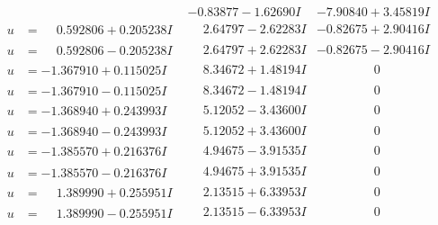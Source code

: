 \documentclass[1p]{elsarticle_modified}
\theoremstyle{definition}
\begin{document}
$$\begin{array}{c|c|c}
 & -0.83877 - 1.62690 I & -7.90840 + 3.45819 I \\ \hline\begin{aligned}
u &= \phantom{-}0.592806 + 0.205238 I\end{aligned}
 & \phantom{-}2.64797 - 2.62283 I & -0.82675 + 2.90416 I \\ \hline\begin{aligned}
u &= \phantom{-}0.592806 - 0.205238 I\end{aligned}
 & \phantom{-}2.64797 + 2.62283 I & -0.82675 - 2.90416 I \\ \hline\begin{aligned}
u &= -1.367910 + 0.115025 I\end{aligned}
 & \phantom{-}8.34672 + 1.48194 I & \phantom{-0.000000 } 0 \\ \hline\begin{aligned}
u &= -1.367910 - 0.115025 I\end{aligned}
 & \phantom{-}8.34672 - 1.48194 I & \phantom{-0.000000 } 0 \\ \hline\begin{aligned}
u &= -1.368940 + 0.243993 I\end{aligned}
 & \phantom{-}5.12052 - 3.43600 I & \phantom{-0.000000 } 0 \\ \hline\begin{aligned}
u &= -1.368940 - 0.243993 I\end{aligned}
 & \phantom{-}5.12052 + 3.43600 I & \phantom{-0.000000 } 0 \\ \hline\begin{aligned}
u &= -1.385570 + 0.216376 I\end{aligned}
 & \phantom{-}4.94675 - 3.91535 I & \phantom{-0.000000 } 0 \\ \hline\begin{aligned}
u &= -1.385570 - 0.216376 I\end{aligned}
 & \phantom{-}4.94675 + 3.91535 I & \phantom{-0.000000 } 0 \\ \hline\begin{aligned}
u &= \phantom{-}1.389990 + 0.255951 I\end{aligned}
 & \phantom{-}2.13515 + 6.33953 I & \phantom{-0.000000 } 0 \\ \hline\begin{aligned}
u &= \phantom{-}1.389990 - 0.255951 I\end{aligned}
 & \phantom{-}2.13515 - 6.33953 I & \phantom{-0.000000 } 0 \\ \hline\begin{aligned}

\end{aligned}
\end{array}$$
\end{document}
